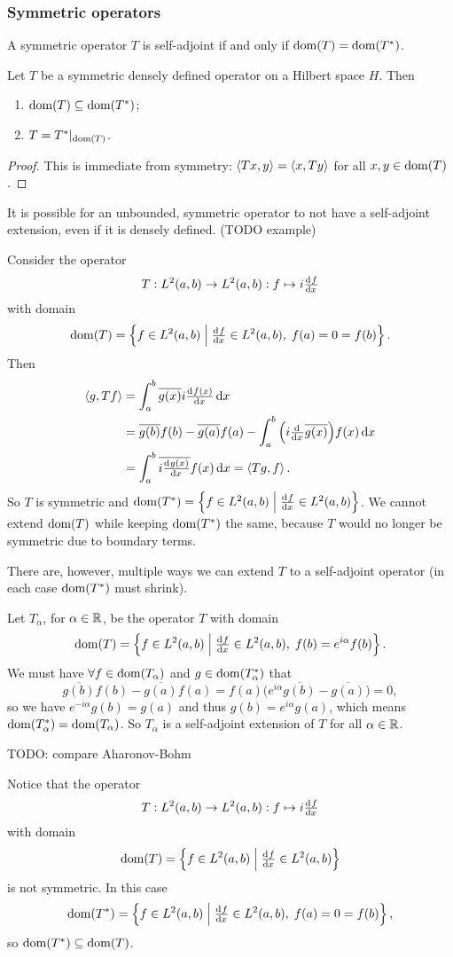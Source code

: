 \subsubsection{Symmetric operators}
A symmetric operator $T$ is self-adjoint if and only if $\operatorname{dom}(T) = \operatorname{dom}(T^*)$.
\begin{lemma}
Let $T$ be a symmetric densely defined operator on a Hilbert space $H$. Then
\begin{enumerate}
\item $\operatorname{dom}(T) \subseteq \operatorname{dom}(T^*)$;
\item $T = T^*|_{\operatorname{dom}(T)}$.
\end{enumerate}
\end{lemma}
\begin{proof}
This is immediate from symmetry: $\left\langle Tx,y \right\rangle = \left\langle x,Ty \right\rangle$ for all $x,y\in\operatorname{dom}(T)$.
\end{proof}
It is possible for an unbounded,
symmetric operator to not have a self-adjoint extension, even if it is densely defined. (TODO example)

\begin{example}
Consider the operator
\[ T: L^2(a,b) \to L^2(a,b): f\mapsto i\od{f}{x} \]
with domain
\[ \dom(T) = \setbuilder{f\in L^2(a,b)}{\od{f}{x}\in L^2(a,b),\; f(a) = 0 = f(b)}. \]
Then
\begin{align*}
\inner{g, Tf} &= \int_{a}^b \overline{g(x)}i\od{f(x)}{x}\diff{x} \\
&= \overline{g(b)}f(b) - \overline{g(a)}f(a) - \int_{a}^b \Big(i \od{}{x}\overline{g(x)}\Big)f(x)\diff{x} \\
&= \int_a^b \overline{i \od{g(x)}{x}} f(x) \diff{x} = \inner{Tg, f}.
\end{align*}
So $T$ is symmetric and $\dom(T^*) = \setbuilder{f\in L^2(a,b)}{\od{f}{x}\in L^2(a,b)}$. We cannot extend $\operatorname{dom}(T)$ while keeping $\operatorname{dom}(T^*)$ the same, because $T$ would no longer be symmetric due to boundary terms.

There are, however, multiple ways we can extend $T$ to a self-adjoint operator (in each case $\operatorname{dom}(T^*)$ must shrink).

Let $T_\alpha$, for $\alpha\in \mathbb{R}$, be the operator $T$ with domain
\[ \dom(T) = \setbuilder{f\in L^2(a,b)}{\od{f}{x}\in L^2(a,b),\; f(b) = e^{i\alpha}f(b)}. \]
We must have $\forall f\in \operatorname{dom}(T_\alpha)$ and $g\in\operatorname{dom}(T^*_\alpha)$ that
\[ \overline{g(b)}f(b) - \overline{g(a)}f(a) = f(a)\Big(e^{i\alpha}\overline{g(b)} - \overline{g(a)}\Big) = 0, \]
so we have $e^{-i\alpha}g(b) = g(a)$ and thus $g(b) = e^{i\alpha}g(a)$, which means $\operatorname{dom}(T_\alpha^*) = \operatorname{dom}(T_\alpha)$. So $T_\alpha$ is a self-adjoint extension of $T$ for all $\alpha\in \mathbb{R}$.

TODO: compare Aharonov-Bohm
\end{example}
Notice that the operator
\[ T: L^2(a,b) \to L^2(a,b): f\mapsto i\od{f}{x} \]
with domain
\[ \dom(T) = \setbuilder{f\in L^2(a,b)}{\od{f}{x}\in L^2(a,b)} \]
is not symmetric. In this case
\[  \dom(T^*) = \setbuilder{f\in L^2(a,b)}{\od{f}{x}\in L^2(a,b),\; f(a)=0=f(b)}, \]
so $\operatorname{dom}(T^*) \subseteq \operatorname{dom}(T)$.





